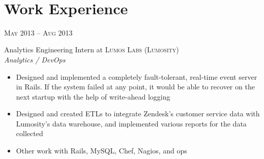 \documentclass[10pt]{article} %
\begin{document}
\renewcommand{\labelitemi}{$\star$}

\color{text1} %


\par{\\ %
	

\begin{minipage}[t]{0.5\textwidth} %
\vspace{0pt} %
	

\section{Work Experience} 


{\raggedleft\textsc{May 2013 -- Aug 2013}\par}

{\raggedright\large Analytics Engineering Intern at \textsc{Lumos Labs (Lumosity)}\\
\textit{Analytics / DevOps}\\[5pt]}

\normalsize{
  \begin{itemize}
  \item Designed and implemented a completely fault-tolerant, real-time
    event server in Rails. If the system failed at any point, it would be
    able to recover on the next startup with the help of write-ahead
    logging
  \item Designed and created ETLs to integrate Zendesk's customer service
    data with Lumosity's data warehouse, and implemented various reports
    for the data collected
  \item Other work with Rails, MySQL, Chef, Nagios, and ops
  \end{itemize}
}\\


\end{minipage}}
\end{document}
